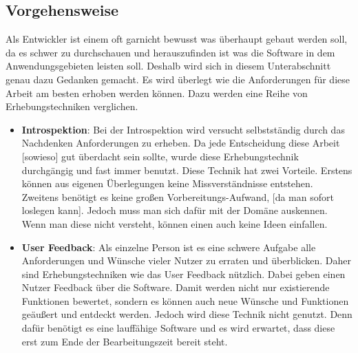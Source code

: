 \subsection{Vorgehensweise}\label{subsection:anforderung:vorgehensweise}\myCheckmark
Als Entwickler ist einem oft garnicht bewusst was überhaupt gebaut werden soll, da es schwer zu durchschauen und herauszufinden ist was die Software in dem Anwendungsgebieten  leisten soll.\newline%
Deshalb wird sich in diesem Unterabschnitt genau dazu Gedanken gemacht. Es wird überlegt wie die Anforderungen für diese Arbeit am besten erhoben werden können. Dazu werden eine Reihe von Erhebungstechniken verglichen. %
%
\begin{itemize}
	\item \textbf{Introspektion}: %
		Bei der Introspektion wird versucht selbstständig durch das Nachdenken Anforderungen zu erheben. 
		Da jede Entscheidung diese Arbeit [sowieso] gut überdacht sein sollte, wurde diese Erhebungstechnik durchgängig und fast immer benutzt. %
		Diese Technik hat zwei Vorteile. Erstens können aus eigenen Überlegungen keine Missverständnisse entstehen. Zweitens benötigt es keine großen Vorbereitungs-Aufwand, [da man sofort loslegen kann]. %
		Jedoch muss man sich dafür mit der Domäne auskennen. Wenn man diese nicht versteht, können einen auch keine Ideen einfallen.%
	\item \textbf{User Feedback}: %
		Als einzelne Person ist es eine schwere Aufgabe alle Anforderungen und Wünsche vieler Nutzer zu erraten und überblicken. Daher sind Erhebungstechniken wie das User Feedback nützlich. %
		Dabei geben einen Nutzer Feedback über die Software. Damit werden nicht nur existierende Funktionen bewertet, sondern es können auch neue Wünsche und Funktionen geäußert und entdeckt werden. %
		Jedoch wird diese Technik nicht genutzt. %
			Denn dafür benötigt es eine lauffähige Software und es wird erwartet, dass diese erst zum Ende der Bearbeitungszeit bereit steht.%

\end{itemize}
